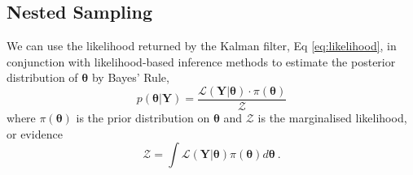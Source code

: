 \documentclass[fleqn,usenatbib,useAMS]{mnras}
\begin{document}
\subsection{Nested Sampling}\label{sec:nested_sampling}
We can use the likelihood returned by the Kalman filter, Eq \ref{eq:likelihood}, in conjunction with likelihood-based inference methods to estimate the posterior distribution of $\boldsymbol{\theta}$ by Bayes' Rule,
\begin{equation}
	p(\boldsymbol{\theta} | \boldsymbol{Y}) = \frac{\mathcal{L}(\boldsymbol{Y} | \boldsymbol{\theta}) \cdot \pi(\boldsymbol{\theta})}{\mathcal{Z}}
\end{equation}
where $\pi(\boldsymbol{\theta})$ is the prior distribution on $\boldsymbol{\theta}$ and $\mathcal{Z}$ is the marginalised likelihood, or evidence
\begin{equation}
	\mathcal{Z} = \int \mathcal{L}(\boldsymbol{Y} | \boldsymbol{\theta})  \pi(\boldsymbol{\theta}) d \boldsymbol{\theta} \ . \label{eq:model_evidence}
\end{equation}
\end{document}
